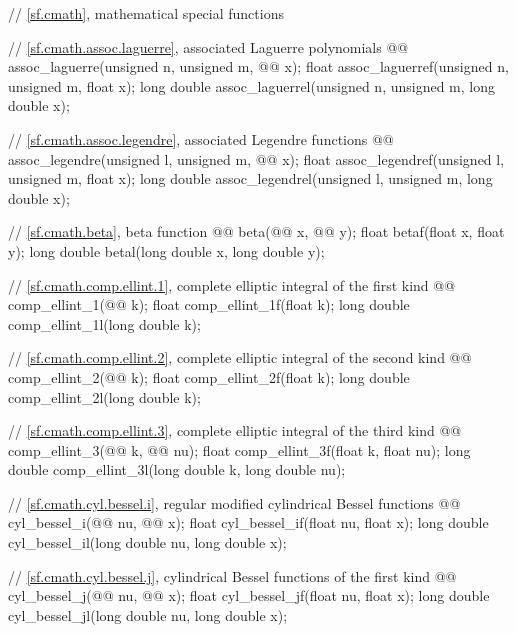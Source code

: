 \begin{codeblock}
{  // \ref{sf.cmath}, mathematical special functions

  // \ref{sf.cmath.assoc.laguerre}, associated Laguerre polynomials
  @@ assoc_laguerre(unsigned n, unsigned m, @@ x);
  float               assoc_laguerref(unsigned n, unsigned m, float x);
  long double         assoc_laguerrel(unsigned n, unsigned m, long double x);

  // \ref{sf.cmath.assoc.legendre}, associated Legendre functions
  @@ assoc_legendre(unsigned l, unsigned m, @@ x);
  float               assoc_legendref(unsigned l, unsigned m, float x);
  long double         assoc_legendrel(unsigned l, unsigned m, long double x);

  // \ref{sf.cmath.beta}, beta function
  @@ beta(@@ x, @@ y);
  float               betaf(float x, float y);
  long double         betal(long double x, long double y);

  // \ref{sf.cmath.comp.ellint.1}, complete elliptic integral of the first kind
  @@ comp_ellint_1(@@ k);
  float               comp_ellint_1f(float k);
  long double         comp_ellint_1l(long double k);

  // \ref{sf.cmath.comp.ellint.2}, complete elliptic integral of the second kind
  @@ comp_ellint_2(@@ k);
  float               comp_ellint_2f(float k);
  long double         comp_ellint_2l(long double k);

  // \ref{sf.cmath.comp.ellint.3}, complete elliptic integral of the third kind
  @@ comp_ellint_3(@@ k, @@ nu);
  float               comp_ellint_3f(float k, float nu);
  long double         comp_ellint_3l(long double k, long double nu);

  // \ref{sf.cmath.cyl.bessel.i}, regular modified cylindrical Bessel functions
  @@ cyl_bessel_i(@@ nu, @@ x);
  float               cyl_bessel_if(float nu, float x);
  long double         cyl_bessel_il(long double nu, long double x);

  // \ref{sf.cmath.cyl.bessel.j}, cylindrical Bessel functions of the first kind
  @@ cyl_bessel_j(@@ nu, @@ x);
  float               cyl_bessel_jf(float nu, float x);
  long double         cyl_bessel_jl(long double nu, long double x);

}
\end{codeblock}
